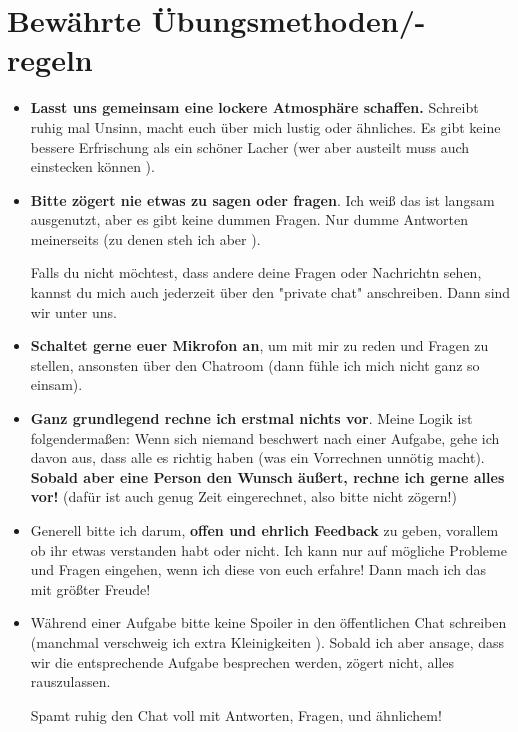 \documentclass{scrartcl}
\begin{document}
	\section*{Bewährte Übungsmethoden/-regeln}
	\begin{itemize}
		\item \textbf{Lasst uns gemeinsam eine lockere Atmosphäre schaffen.} Schreibt ruhig mal Unsinn, macht euch über mich lustig oder ähnliches. Es gibt keine bessere Erfrischung als ein schöner Lacher (wer aber austeilt muss auch einstecken können \Cooley).
		
		\item \textbf{Bitte zögert nie etwas zu sagen oder fragen}. Ich weiß das ist langsam ausgenutzt, aber es gibt keine dummen Fragen. Nur dumme Antworten meinerseits (zu denen steh ich aber \Laughey).
		
		Falls du nicht möchtest, dass andere deine Fragen oder Nachrichtn sehen, kannst du mich auch jederzeit über den "private chat" anschreiben. Dann sind wir unter uns. \Winkey
		
		\item \textbf{Schaltet gerne euer Mikrofon an}, um mit mir zu reden und Fragen zu stellen, ansonsten über den Chatroom (dann fühle ich mich nicht ganz so einsam).
		
		\item \textbf{Ganz grundlegend rechne ich erstmal nichts vor}. Meine Logik ist folgendermaßen: Wenn sich niemand beschwert nach einer Aufgabe, gehe ich davon aus, dass alle es richtig haben (was ein Vorrechnen unnötig macht). \textbf{Sobald aber eine Person den Wunsch äußert, rechne ich gerne alles vor!} (dafür ist auch genug Zeit eingerechnet, also bitte nicht zögern!)
		
		\item Generell bitte ich darum, \textbf{offen und ehrlich Feedback} zu geben, vorallem ob ihr etwas verstanden habt oder nicht. Ich kann nur auf mögliche Probleme und Fragen eingehen, wenn ich diese von euch erfahre! Dann mach ich das mit größter Freude!
		
		\item Während einer Aufgabe bitte keine Spoiler in den öffentlichen Chat schreiben (manchmal verschweig ich extra Kleinigkeiten \Winkey). Sobald ich aber ansage, dass wir die entsprechende Aufgabe besprechen werden, zögert nicht, alles rauszulassen. \Smiley
		
		Spamt ruhig den Chat voll mit Antworten, Fragen, und ähnlichem!
		
	\end{itemize}
\end{document}
